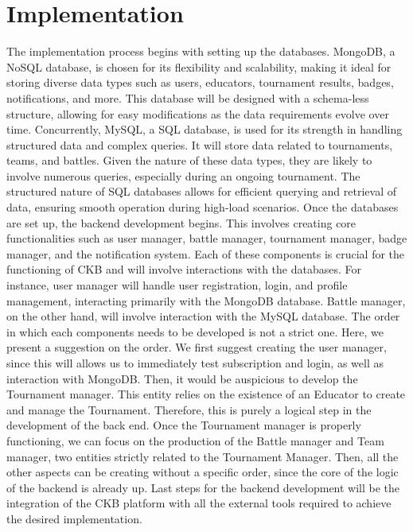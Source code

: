 \section{Implementation}
The implementation process begins with setting up the databases. MongoDB, a NoSQL database, is chosen for its flexibility and scalability, 
making it ideal for storing diverse data types such as users, educators, tournament results, badges, notifications, and more. 
This database will be designed with a schema-less structure, allowing for easy modifications as the data requirements evolve over time.\newline
Concurrently, MySQL, a SQL database, is used for its strength in handling structured data and complex queries. 
It will store data related to tournaments, teams, and battles. Given the nature of these data types, they are likely to involve numerous queries, 
especially during an ongoing tournament. The structured nature of SQL databases allows for efficient querying and retrieval of data, 
ensuring smooth operation during high-load scenarios.\newline
Once the databases are set up, the backend development begins. 
This involves creating core functionalities such as user manager, battle manager, tournament manager, badge manager, and the notification system. 
Each of these components is crucial for the functioning of CKB and will involve interactions with the databases. 
For instance, user manager will handle user registration, login, and profile management, interacting primarily with the MongoDB database. 
Battle manager, on the other hand, will involve interaction with the MySQL database. The order in which each components needs to be developed is not a strict one. 
Here, we present a suggestion on the order.\newline
We first suggest creating the user manager, since this will allows us to immediately test subscription and login, as well as interaction with MongoDB. 
Then, it would be auspicious to develop the Tournament manager. This entity relies on the existence of an Educator to create and manage the Tournament. 
Therefore, this is purely a logical step in the development of the back end. 
Once the Tournament manager is properly functioning, we can focus on the production of the Battle manager and Team manager, two entities strictly related to the 
Tournament Manager. Then, all the other aspects can be creating without a specific order, since the core of the logic of the backend is already up.\newline
Last steps for the backend development will be the integration of the CKB platform with all the external tools required to achieve the desired implementation. 

